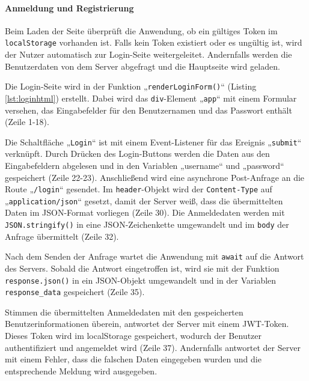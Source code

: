 \documentclass[12pt, letterpaper]{article}
\begin{document}
  \paragraph{Anmeldung und Registrierung}
  \par \textbf{}
  \par Beim Laden der Seite überprüft die Anwendung, ob ein gültiges Token im \texttt{localStorage} vorhanden ist. Falls kein Token existiert oder es ungültig ist, wird der Nutzer automatisch zur Login-Seite weitergeleitet. Andernfalls werden die Benutzerdaten von dem Server abgefragt und die Hauptseite wird geladen.
  \par Die Login-Seite wird in der Funktion „\texttt{renderLoginForm()}“ (Listing \ref{lst:loginhtml}) erstellt. Dabei wird das \texttt{div}-Element „\texttt{app}“ mit einem Formular versehen, das Eingabefelder für den Benutzernamen und das Passwort enthält (Zeile 1-18). 
  \par Die Schaltfläche „\texttt{Login}“ ist mit einem Event-Listener für das Ereignis „\texttt{submit}“ verknüpft. Durch Drücken des Login-Buttons werden die Daten aus den Eingabefeldern abgelesen und in den Variablen „username“ und „password“ gespeichert (Zeile 22-23). Anschließend wird eine asynchrone Post-Anfrage an die Route „\texttt{/login}“ gesendet. Im \texttt{header}-Objekt wird der \texttt{Content-Type} auf „\texttt{application/json}“ gesetzt, damit der Server weiß, dass die übermittelten Daten im JSON-Format vorliegen (Zeile 30). Die Anmeldedaten werden mit \texttt{JSON.stringify()} in eine JSON-Zeichenkette umgewandelt und im \texttt{body} der Anfrage übermittelt (Zeile 32). 
  \par Nach dem Senden der Anfrage wartet die Anwendung mit \texttt{await} auf die Antwort des Servers. Sobald die Antwort eingetroffen ist, wird sie mit der Funktion \texttt{response.json()} in ein JSON-Objekt umgewandelt und in der Variablen \texttt{response\_data} gespeichert (Zeile 35).
  \par Stimmen die übermittelten Anmeldedaten mit den gespeicherten Benutzerinformationen überein, antwortet der Server mit einem JWT-Token. Dieses Token wird im localStorage gespeichert, wodurch der Benutzer authentifiziert und angemeldet wird (Zeile 37). Andernfalls antwortet der Server mit einem Fehler, dass die falschen Daten eingegeben wurden und die entsprechende Meldung wird ausgegeben.
  \pagebreak
\end{document}
